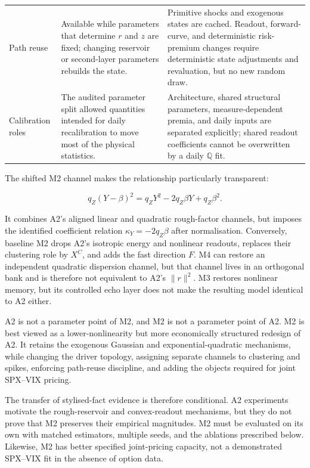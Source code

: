 \documentclass[11pt,a4paper]{article}
\newcommand{\Qq}{\mathbb{Q}}
\begin{document}
\begin{longtable}{@{}L{25mm}L{56mm}L{56mm}@{}}
\addlinespace
Path reuse
& Available while parameters that determine \(r\) and \(z\) are fixed; changing reservoir or
second-layer parameters rebuilds the state.
& Primitive shocks and exogenous states are cached. Readout, forward-curve, and deterministic
risk-premium changes require deterministic state adjustments and revaluation, but no new
random draw. \\
\addlinespace
Calibration roles
& The audited parameter split allowed quantities intended for daily recalibration to move most
of the physical statistics.
& Architecture, shared structural parameters, measure-dependent premia, and daily inputs are
separated explicitly; shared readout coefficients cannot be overwritten by a daily \(\Qq\) fit. \\
\bottomrule
\end{longtable}
\normalsize

The shifted M2 channel makes the relationship particularly transparent:

\begin{equation}
q_Z(Y-\beta)^2=q_ZY^2-2q_Z\beta Y+q_Z\beta^2.
\label{eq:m2-shift-expansion}
\end{equation}

It combines A2's aligned linear and quadratic rough-factor channels, but imposes the identified
coefficient relation \(\kappa_Y=-2q_Z\beta\) after normalisation. Conversely, baseline M2 drops
A2's isotropic energy and nonlinear readouts, replaces their clustering role by \(X^C\), and
adds the fast direction \(F\). M4 can restore an independent quadratic dispersion channel, but
that channel lives in an orthogonal bank and is therefore not equivalent to A2's
\(\lVert r\rVert^2\). M3 restores nonlinear memory, but its controlled echo layer does not make
the resulting model identical to A2 either.

\begin{resultbox}
A2 is not a parameter point of M2, and M2 is not a parameter point of A2. M2 is best viewed as
a lower-nonlinearity but more economically structured redesign of A2. It retains the exogenous
Gaussian and exponential-quadratic mechanisms, while changing the driver topology, assigning
separate channels to clustering and spikes, enforcing path-reuse discipline, and adding the
objects required for joint SPX--VIX pricing.
\end{resultbox}

The transfer of stylised-fact evidence is therefore conditional. A2 experiments motivate the
rough-reservoir and convex-readout mechanisms, but they do not prove that M2 preserves their
empirical magnitudes. M2 must be evaluated on its own with matched estimators, multiple seeds,
and the ablations prescribed below. Likewise, M2 has better specified joint-pricing capacity,
not a demonstrated SPX--VIX fit in the absence of option data.
\end{document}
